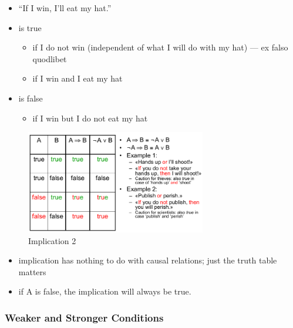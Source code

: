 \begin{itemize}
\tightlist
\item
  ``If I win, I'll eat my hat.''
\item
  is true

  \begin{itemize}
  \tightlist
  \item
    if I do not win (independent of what I will do with my hat) --- ex
    falso quodlibet
  \item
    if I win and I eat my hat
  \end{itemize}
\item
  is false

  \begin{itemize}
  \tightlist
  \item
    if I win but I do not eat my hat
  \end{itemize}
\end{itemize}

\begin{figure}[H]
\centering
\includegraphics[width=0.7\textwidth]{figures/implication2.png}
\caption{Implication 2}
\end{figure}

\begin{itemize}
\tightlist
\item
  implication has nothing to do with causal relations; just the truth
  table matters
\item
  if A is false, the implication will always be true.
\end{itemize}

\clearpage
\hypertarget{weaker-and-stronger-conditions}{%
\subsubsection{Weaker and Stronger
Conditions}\label{weaker-and-stronger-conditions}}

